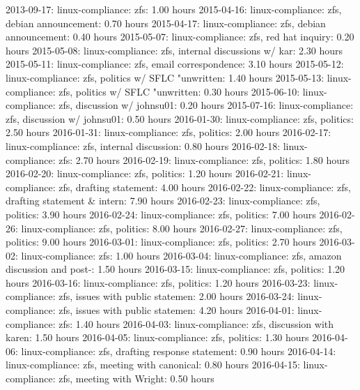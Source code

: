 2013-09-17:                              linux-compliance: zfs:     1.00 hours
2015-04-16:         linux-compliance: zfs, debian announcement:     0.70 hours
2015-04-17:         linux-compliance: zfs, debian announcement:     0.40 hours
2015-05-07:             linux-compliance: zfs, red hat inquiry:     0.20 hours
2015-05-08: linux-compliance: zfs, internal discussions w/ kar:     2.30 hours
2015-05-11:        linux-compliance: zfs, email correspondence:     3.10 hours
2015-05-12: linux-compliance: zfs, politics w/ SFLC "unwritten:     1.40 hours
2015-05-13: linux-compliance: zfs, politics w/ SFLC "unwritten:     0.30 hours
2015-06-10:      linux-compliance: zfs, discussion w/ johnsu01:     0.20 hours
2015-07-16:      linux-compliance: zfs, discussion w/ johnsu01:     0.50 hours
2016-01-30:                    linux-compliance: zfs, politics:     2.50 hours
2016-01-31:                    linux-compliance: zfs, politics:     2.00 hours
2016-02-17:         linux-compliance: zfs, internal discussion:     0.80 hours
2016-02-18:                              linux-compliance: zfs:     2.70 hours
2016-02-19:                    linux-compliance: zfs, politics:     1.80 hours
2016-02-20:                    linux-compliance: zfs, politics:     1.20 hours
2016-02-21:          linux-compliance: zfs, drafting statement:     4.00 hours
2016-02-22: linux-compliance: zfs, drafting statement & intern:     7.90 hours
2016-02-23:                    linux-compliance: zfs, politics:     3.90 hours
2016-02-24:                    linux-compliance: zfs, politics:     7.00 hours
2016-02-26:                    linux-compliance: zfs, politics:     8.00 hours
2016-02-27:                    linux-compliance: zfs, politics:     9.00 hours
2016-03-01:                    linux-compliance: zfs, politics:     2.70 hours
2016-03-02:                              linux-compliance: zfs:     1.00 hours
2016-03-04: linux-compliance: zfs, amazon discussion and post-:     1.50 hours
2016-03-15:                    linux-compliance: zfs, politics:     1.20 hours
2016-03-16:                    linux-compliance: zfs, politics:     1.20 hours
2016-03-23: linux-compliance: zfs, issues with public statemen:     2.00 hours
2016-03-24: linux-compliance: zfs, issues with public statemen:     4.20 hours
2016-04-01:                              linux-compliance: zfs:     1.40 hours
2016-04-03:       linux-compliance: zfs, discussion with karen:     1.50 hours
2016-04-05:                    linux-compliance: zfs, politics:     1.30 hours
2016-04-06: linux-compliance: zfs, drafting response statement:     0.90 hours
2016-04-14:      linux-compliance: zfs, meeting with canonical:     0.80 hours
2016-04-15:         linux-compliance: zfs, meeting with Wright:     0.50 hours
